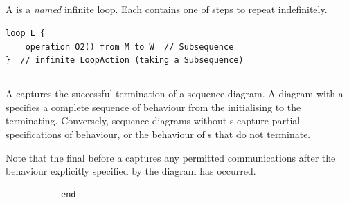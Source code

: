 \subsection{\mloopaction}

A \mloopaction{} is a \emph{named} infinite loop.    Each \mloopaction{} contains one
\msubsequence{} of steps to repeat indefinitely.

\begin{lstlisting}[style=Example]
loop L {
    operation O2() from M to W  // Subsequence
}  // infinite LoopAction (taking a Subsequence)
\end{lstlisting}

\subsection{\mfinalaction}

A \mfinalaction{} captures the successful termination of a sequence diagram.
A diagram with a \mfinalaction{} specifies a complete sequence of behaviour
from the \mtarget{} initialising to the \mtarget{} terminating.  Conversely,
sequence diagrams without \mfinalaction s capture partial specifications of
behaviour, or the behaviour of \mtarget s that do not terminate.

Note that the final \msequencegap{} before a \mfinalaction{} captures
any permitted communications after the behaviour explicitly specified by the
diagram has occurred.

\begin{figure}[h]

\begin{subfigure}[t]{0.38\textwidth}
\begin{lstlisting}[style=Example]
end
\end{lstlisting}
\end{subfigure}
\hfill
\begin{subfigure}[t]{0.58\textwidth}
\gsecaption
\centering
{}
\end{subfigure}

\end{figure}

